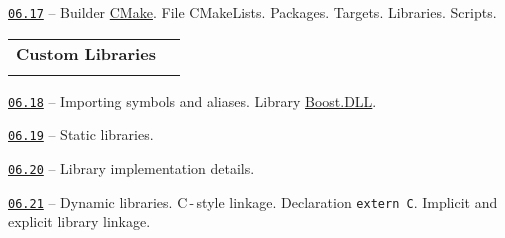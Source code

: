 \documentclass[a4paper,12pt]{article}
\renewenvironment{itemize}
{
    \begin{list}{\labelitemi}
    {
      \setlength{\topsep}{0pt}
      \setlength{\partopsep}{0pt}
      \setlength{\parskip}{0pt}
      \setlength{\itemsep}{0pt}
      \setlength{\parsep}{0pt}
      \setlength{\leftmargin}{14.5pt}
    }
}{\end{list}}
\begin{document}
\medskip\smallskip

\begin{itemize}

    \item \href{https://github.com/i-s-m-mipt/Education/blob/master/projects/examples/CMakeLists.txt}{\texttt{06.17}} -- Builder \href{https://cmake.org/}{CMake}. File CMakeLists. Packages. Targets. Libraries. Scripts.

\end{itemize}

\bigskip\medskip

\begin{tabular}{!{\vrule width 1pt}L{3.3cm}!{\vrule width 1pt}L{15.7cm}!{\vrule width 0pt}} 


\textbf{Custom Libraries} & \\


\end{tabular}

\medskip\smallskip

\begin{itemize}

    \item \href{https://github.com/i-s-m-mipt/Education/blob/master/projects/examples/source/06.18.cpp}{\texttt{06.18}} -- Importing symbols and aliases. Library \href{https://www.boost.org/doc/libs/1_84_0/doc/html/boost_dll.html}{Boost.DLL}.

    \smallskip

    \item \href{https://github.com/i-s-m-mipt/Education/blob/master/projects/library_v1/source/06.19.hpp}{\texttt{06.19}} -- Static libraries.

    \smallskip

    \item \href{https://github.com/i-s-m-mipt/Education/blob/master/projects/library_v1/source/06.20.cpp}{\texttt{06.20}} -- Library implementation details.

    \smallskip

    \item \href{https://github.com/i-s-m-mipt/Education/blob/master/projects/library_v2/source/06.21.cpp}{\texttt{06.21}} -- Dynamic libraries. C\,-\,style linkage. Declaration \lstinline{extern C}. Implicit and explicit library linkage.

\end{itemize}
\end{document}
